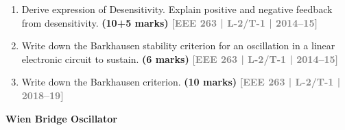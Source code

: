 \documentclass[12pt,a4paper]{article}
\newcommand{\yr}[1]{\hfill\textcolor{gray}{\small\textbf{[#1]}}}
\newcommand{\mk}[1]{\textcolor{orange!70!black}{\small\textbf{(#1 marks)}}}
\newcommand{\subtopic}[2]{%
  \vspace{10pt}
  \noindent\begin{tcolorbox}[colback=#1!8,colframe=#1,boxrule=0.6pt,arc=4pt,
    left=6pt,right=6pt,top=4pt,bottom=4pt]
    \small\bfseries\textcolor{#1}{#2}
  \end{tcolorbox}
  \vspace{2pt}
}
\begin{document}
\begin{enumerate}

    \item Derive expression of Desensitivity. Explain positive and negative feedback from desensitivity.
\mk{10+5} \yr{EEE 263 | L-2/T-1 | 2014--15}


\item Write down the Barkhausen stability criterion for an oscillation in a linear electronic circuit to sustain.
\mk{6} \yr{EEE 263 | L-2/T-1 | 2014--15}

\item Write down the Barkhausen criterion.
\mk{10} \yr{EEE 263 | L-2/T-1 | 2018--19}

\end{enumerate}

\subtopic{cF}{Wien Bridge Oscillator}
\label{sub:s8-wien}
\end{document}
